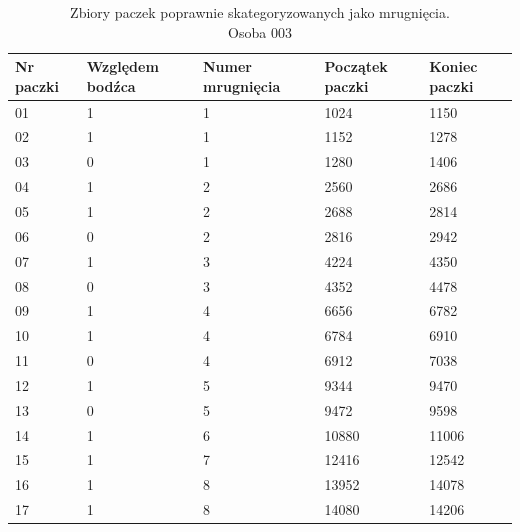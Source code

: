 \documentclass{article}
\begin{document}
        \begin{table}[H]
            \captionsetup{justification=centering}
            \caption {Zbiory paczek poprawnie skategoryzowanych jako mrugnięcia. \\ Osoba 003}
            \begin{center}
                \begin{tabular}{| p{1cm} | p{1.75cm} | p{1.75cm} | p{1.75cm} | p{1.75cm} |}
                    \hline
                    Nr paczki & Względem bodźca & Numer mrugnięcia & Początek paczki & Koniec paczki \\
                    \hline
                    \hline
                    01 & 1 & 1 & 1024 & 1150 \\
                    \hline
                    02 & 1 & 1 & 1152 & 1278 \\
                    \hline
                    03 & 0 & 1 & 1280 & 1406 \\
                    \hline
                    04 & 1 & 2 & 2560 & 2686 \\
                    \hline
                    05 & 1 & 2 & 2688 & 2814 \\
                    \hline
                    06 & 0 & 2 & 2816 & 2942 \\
                    \hline
                    07 & 1 & 3 & 4224 & 4350 \\
                    \hline
                    08 & 0 & 3 & 4352 & 4478 \\
                    \hline
                    09 & 1 & 4 & 6656 & 6782 \\
                    \hline
                    10 & 1 & 4 & 6784 & 6910 \\
                    \hline
                    11 & 0 & 4 & 6912 & 7038 \\
                    \hline
                    12 & 1 & 5 & 9344 & 9470 \\
                    \hline
                    13 & 0 & 5 & 9472 & 9598 \\
                    \hline
                    14 & 1 & 6 & 10880 & 11006 \\
                    \hline
                    15 & 1 & 7 & 12416 & 12542 \\
                    \hline
                    16 & 1 & 8 & 13952 & 14078 \\
                    \hline
                    17 & 1 & 8 & 14080 & 14206 \\

\end{tabular}
\end{center}
\end{table}
\end{document}
